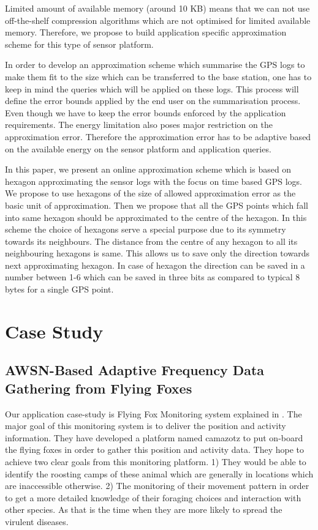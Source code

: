 \documentclass[conference]{IEEEtran}
\begin{document}
Limited amount of available memory (around 10 KB) means that we can not use off-the-shelf compression algorithms which are not optimised for limited available memory. Therefore, we propose to build application specific approximation scheme for this type of sensor platform.\

In order to develop an approximation scheme which summarise the GPS logs to make them fit to the size which can be transferred to the base station, one has to keep in mind the queries which will be applied on these logs. This process will define the error bounds applied by the end user on the summarisation process. Even though we have to keep the error bounds enforced by the application requirements. The energy limitation also poses major restriction on the approximation error. Therefore the approximation error has to be adaptive based on the available energy on the sensor platform and application queries.

In this paper, we present an online approximation scheme which is based on hexagon approximating the sensor logs with the focus on time based GPS logs. We propose to use hexagons of the size of allowed approximation error as the basic unit of approximation. Then we propose that all the GPS points which fall into same hexagon should be approximated to the centre of the hexagon. In this scheme the choice of hexagons serve a special purpose due to its symmetry towards its neighbours. The distance from the centre of any hexagon to all its neighbouring hexagons is same. This allows us to save only the direction towards next approximating hexagon. In case of hexagon the direction can be saved in a number between 1-6 which can be saved in three bits as compared to typical 8 bytes for a single GPS point.

\section{Case Study}
\subsection{AWSN-Based Adaptive Frequency Data Gathering from Flying Foxes} \label{case-study}
Our application case-study is Flying Fox Monitoring system explained in \cite{raja-ipsn}. The major goal of this monitoring system is to deliver the position and activity information. They have developed a platform named camazotz to put on-board the flying foxes in order to gather this position and activity data. They hope to achieve two clear goals from this monitoring platform. 1) They would be able to identify the roosting camps of these animal which are generally in locations which are inaccessible otherwise. 2) The monitoring of their movement pattern in order to get a more detailed knowledge of their foraging choices and interaction with other species. As that is the time when they are more likely to spread the virulent diseases.\
\end{document}
